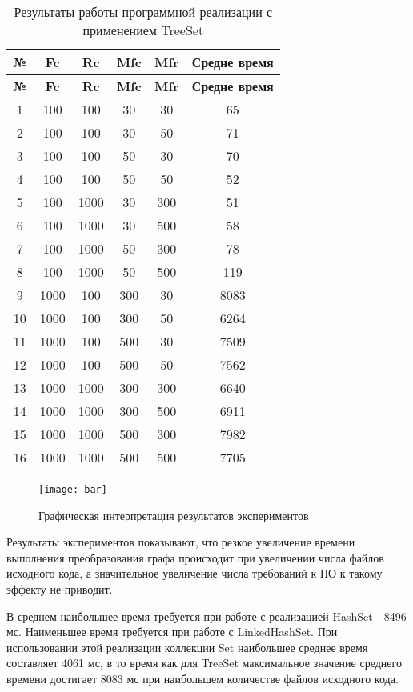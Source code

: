 \begin{longtable}{|c|c|c|c|c|c|}
    \caption{Результаты работы программной реализации с применением TreeSet}
    \label{tab:treeset}\\
    \hline
    \bfseries{№} & \bfseries{Fc} & \bfseries{Rc} & \bfseries{Mfc} & \bfseries{Mfr} & \bfseries{Средне время} \\
    \hline
    \endfirsthead
    \hline
    \bfseries{№} & \bfseries{Fc} & \bfseries{Rc} & \bfseries{Mfc} & \bfseries{Mfr} & \bfseries{Средне время} \\
    \hline
    \endhead
    \hline
    1 & 100 & 100 & 30 & 30 & 65 \\
    \hline
    2 & 100 & 100 & 30 & 50 & 71 \\
    \hline
    3 & 100 & 100 & 50 & 30 & 70 \\
    \hline
    4 & 100 & 100 & 50 & 50 & 52 \\
    \hline
    5 & 100 & 1000 & 30 & 300 & 51 \\
    \hline
    6 & 100 & 1000 & 30 & 500 & 58 \\
    \hline
    7 & 100 & 1000 & 50 & 300 & 78 \\
    \hline
    8 & 100 & 1000 & 50 & 500 & 119 \\
    \hline
    9 & 1000 & 100 & 300 & 30 & 8083 \\
    \hline
    10 & 1000 & 100 & 300 & 50 & 6264 \\
    \hline
    11 & 1000 & 100 & 500 & 30 & 7509 \\
    \hline
    12 & 1000 & 100 & 500 & 50 & 7562 \\
    \hline
    13 & 1000 & 1000 & 300 & 300 & 6640 \\
    \hline
    14 & 1000 & 1000 & 300 & 500 & 6911 \\
    \hline
    15 & 1000 & 1000 & 500 & 300 & 7982 \\
    \hline
    16 & 1000 & 1000 & 500 & 500 & 7705 \\
    \hline
\end{longtable}

\begin{figure}[H]
    \centering
    \texttt{[image: bar]}
    \caption{Графическая интерпретация результатов экспериментов}
    \label{fig:bar}
\end{figure}

Результаты экспериментов показывают, что резкое увеличение времени выполнения преобразования графа происходит при увеличении числа файлов исходного кода, а значительное увеличение числа требований к ПО к такому эффекту не приводит.

В среднем наибольшее время требуется при работе с реализацией HashSet - 8496 мс. Наименьшее время требуется при работе с LinkedHashSet. При использовании этой реализации коллекции Set наибольшее среднее время составляет 4061 мс, в то время как для TreeSet максимальное значение среднего времени достигает 8083 мс при наибольшем количестве файлов исходного кода.